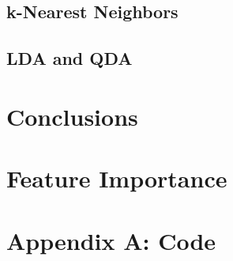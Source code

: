 \documentclass{article}
\begin{document}
\subsection{k-Nearest Neighbors}



\subsection{LDA and QDA}



\section{Conclusions}



\section{Feature Importance}



\newpage

\section*{Appendix A: Code}


\end{document}
